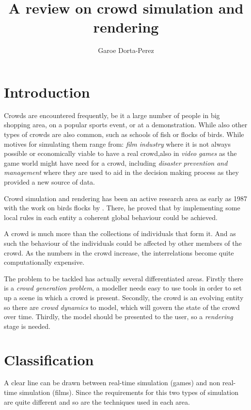 \documentclass[conference]{acmsiggraph}
\title{A review on crowd simulation and rendering}
\author{Garoe Dorta-Perez}
\begin{document}
\maketitle


\section{Introduction}

Crowds are encountered frequently, be it a large number of people in big shopping area, on a popular sports event, or at a demonstration.
While also other types of crowds are also common, such as schools of fish or flocks of birds.
While motives for simulating them range from: \textit{film industry} where it is not always possible or economically viable to have a real crowd,also in \textit{video games} as the game world might have need for a crowd, including \textit{disaster prevention and management} where they are used to aid in the decision making process as they provided a new source of data. 

Crowd simulation and rendering has been an active research area as early as 1987 with the work on birds flocks by \cite{Reynolds1987}.
There, he proved that by implementing some local rules in each entity a coherent global behaviour could be achieved.
 
A crowd is much more than the collections of individuals that form it.
And as such the behaviour of the individuals could be affected by other members of the crowd.
As the numbers in the crowd increase, the interrelations become quite computationally expensive.

The problem to be tackled has actually several differentiated areas.
Firstly there is a \textit{crowd generation problem}, a modeller needs easy to use tools in order to set up a scene in which a crowd is present.
Secondly, the crowd is an evolving entity so there are \textit{crowd dynamics} to model, which will govern the state of the crowd over time.
Thirdly, the model should be presented to the user, so a \textit{rendering} stage is needed.

\section{Classification}

A clear line can be drawn between real-time simulation (games) and non real-time simulation (films).
Since the requirements for this two types of simulation are quite different and so are the techniques used in each area.
\end{document}
